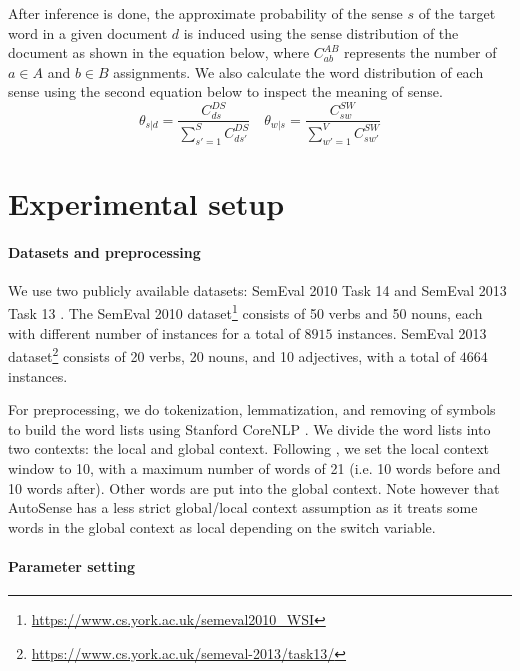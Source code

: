 \documentclass[letterpaper]{article}
\begin{document}
After inference is done, the approximate probability of the sense $s$ of the target word in a given document $d$ is induced using the sense distribution of the document as shown in the equation below, where $C^{AB}_{ab}$ represents the number of $a \in A$ and $b \in B$ assignments. We also calculate the word distribution of each sense using the second equation below to inspect the meaning of sense.
\begin{equation}
    \label{eq:induction}
    \theta_{s|d} = \frac{C^{DS}_{ds}}{\sum^S_{s'=1}C^{DS}_{ds'}}
    \quad
	\theta_{w|s} = \frac{C^{SW}_{sw}}{\sum^{V}_{w'=1}C^{SW}_{sw'}}
\end{equation}
\section{Experimental setup} %

\paragraph{Datasets and preprocessing}

We use two publicly available datasets: SemEval 2010 Task 14 \cite{manandhar2010semeval} and SemEval 2013 Task 13 \cite{jurgens2013semeval}. The SemEval 2010 dataset\footnote{\url{https://www.cs.york.ac.uk/semeval2010_WSI}} consists of 50 verbs and 50 nouns, each with different number of instances for a total of $8915$ instances. SemEval 2013 dataset\footnote{\url{https://www.cs.york.ac.uk/semeval-2013/task13/}} consists of 20 verbs, 20 nouns, and 10 adjectives, with a total of $4664$ instances.

For preprocessing, we do tokenization, lemmatization, and removing of symbols to build the word lists using Stanford CoreNLP \cite{manning2014stanford}. We divide the word lists into two contexts: the local and global context. Following \cite{wang2015sense}, we set the local context window to 10, with a maximum number of words of 21 (i.e. 10 words before and 10 words after). Other words are put into the global context. Note however that AutoSense has a less strict global/local context assumption as it treats some words in the global context as local depending on the switch variable.

\paragraph{Parameter setting}
\end{document}
